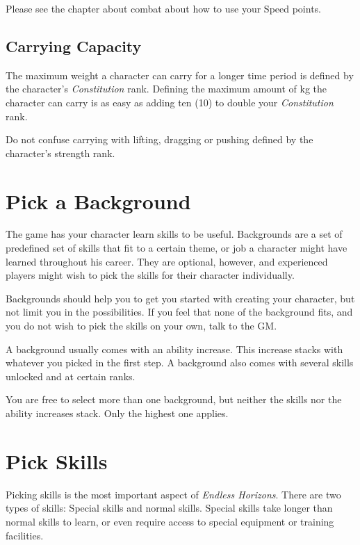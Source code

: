 Please see the chapter about combat about how to use your Speed points.

\subsection{Carrying Capacity}
\label{sub:2-Carrying}

The maximum weight a character can carry for a longer time period is defined
by the character's \emph{Constitution} rank. Defining the maximum amount of kg
the character can carry is as easy as adding ten (10) to double your
\emph{Constitution} rank.

Do not confuse carrying with lifting, dragging or pushing defined by
the character's strength rank.

\section{Pick a Background}
\label{sec:2-Pick a Background}

The game has your character learn skills to be useful. Backgrounds are a set of
predefined set of skills that fit to a certain theme, or job a character might
have learned throughout his career. They are optional, however, and experienced
players might wish to pick the skills for their character individually.

Backgrounds should help you to get you started with creating your character, but
not limit you in the possibilities. If you feel that none of the background fits,
and you do not wish to pick the skills on your own, talk to the GM.

A background usually comes with an ability increase. This increase stacks with
whatever you picked in the first step. A background also comes with several
skills unlocked and at certain ranks.

You are free to select more than one background, but neither the skills nor the
ability increases stack. Only the highest one applies.

\section{Pick Skills}
\label{sec:2-Pick Skills}

Picking skills is the most important aspect of \emph{Endless Horizons}. There
are two types of skills: Special skills and normal skills. Special skills take
longer than normal skills to learn, or even require access to special equipment
or training facilities.

